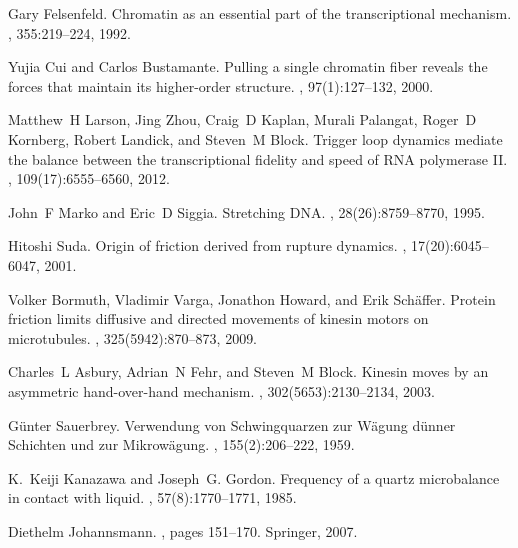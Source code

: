 \documentclass[floatfix,superscriptaddress,a4paper,twocolumn]{revtex4-1}
\begin{document}
\begin{thebibliography}{10}

Gary Felsenfeld.
\newblock Chromatin as an essential part of the transcriptional mechanism.
, 355:219--224, 1992.

Yujia Cui and Carlos Bustamante.
\newblock Pulling a single chromatin fiber reveals the forces that maintain its
  higher-order structure.
,
  97(1):127--132, 2000.

Matthew~H Larson, Jing Zhou, Craig~D Kaplan, Murali Palangat, Roger~D Kornberg,
  Robert Landick, and Steven~M Block.
\newblock Trigger loop dynamics mediate the balance between the transcriptional
  fidelity and speed of {RNA} polymerase {II}.
,
  109(17):6555--6560, 2012.

John~F Marko and Eric~D Siggia.
\newblock Stretching {DNA}.
, 28(26):8759--8770, 1995.

Hitoshi Suda.
\newblock Origin of friction derived from rupture dynamics.
, 17(20):6045--6047, 2001.

Volker Bormuth, Vladimir Varga, Jonathon Howard, and Erik Sch{\"a}ffer.
\newblock Protein friction limits diffusive and directed movements of kinesin
  motors on microtubules.
, 325(5942):870--873, 2009.

Charles~L Asbury, Adrian~N Fehr, and Steven~M Block.
\newblock Kinesin moves by an asymmetric hand-over-hand mechanism.
, 302(5653):2130--2134, 2003.

G{\"u}nter Sauerbrey.
\newblock Verwendung von {S}chwingquarzen zur {W}{\"a}gung d{\"u}nner
  {S}chichten und zur {M}ikrow{\"a}gung.
, 155(2):206--222, 1959.

K.~Keiji Kanazawa and Joseph~G. Gordon.
\newblock Frequency of a quartz microbalance in contact with liquid.
, 57(8):1770--1771, 1985.

Diethelm Johannsmann.
, pages 151--170.
\newblock Springer, 2007.


\end{thebibliography}
\end{document}
